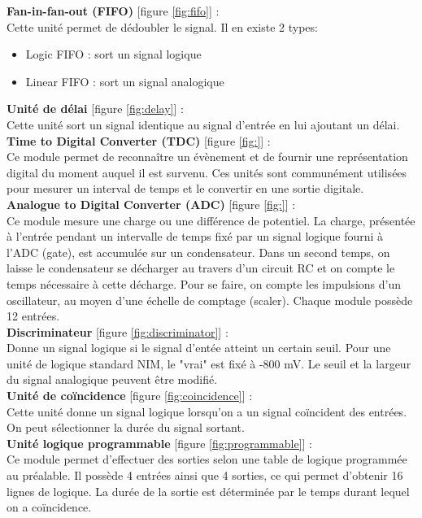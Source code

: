 \textbf{Fan-in-fan-out (FIFO)} [figure  \ref{fig:fifo}] :\\
Cette unité permet de dédoubler le signal. Il en existe 2 types:
\begin{itemize}
\item Logic FIFO : sort un signal logique
\item Linear FIFO : sort un signal analogique\\
\end{itemize}

\textbf{Unité de délai} [figure \ref{fig:delay}] :\\
Cette unité sort un signal identique au signal d'entrée en lui ajoutant un délai.\\

\textbf{Time to Digital Converter (TDC)} [figure \ref{fig:}] :\\
Ce module permet de reconnaître un évènement et de fournir une représentation digital du moment auquel il est survenu. Ces unités sont communément utilisées pour mesurer un interval de temps et le convertir en une sortie digitale.\\

\textbf{Analogue to Digital Converter (ADC)} [figure \ref{fig:}] :\\
Ce module mesure une charge ou une différence de potentiel. 
La charge, présentée à l’entrée pendant un intervalle de temps fixé par un signal logique fourni à l’ADC (gate), est accumulée sur un condensateur. Dans un second temps, on laisse le condensateur se décharger au travers d’un circuit RC et on compte le temps nécessaire à cette décharge. Pour se faire, on compte les impulsions d’un oscillateur, au moyen d’une échelle de comptage (scaler). Chaque module possède 12 entrées.\\

\textbf{Discriminateur} [figure \ref{fig:discriminator}] :\\
Donne un signal logique si le signal d'entée atteint un certain seuil. Pour une unité de logique standard NIM, le "vrai" est fixé à -800 mV. Le seuil et la largeur du signal analogique peuvent être modifié.\\

\textbf{Unité de coïncidence} [figure \ref{fig:coincidence}] :\\
Cette unité donne un signal logique lorsqu'on a un signal coïncident des entrées. On peut sélectionner la durée du signal sortant.\\

\textbf{Unité logique programmable} [figure  \ref{fig:programmable}]  :\\
Ce module permet d'effectuer des sorties selon une table de logique programmée au préalable. Il possède 4 entrées ainsi que 4 sorties, ce qui permet d'obtenir 16 lignes de logique. La durée de la sortie est déterminée par le temps durant lequel on a coïncidence. \\